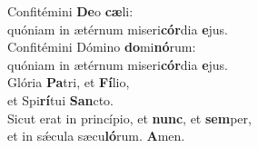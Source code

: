 \evenverse Confitémini \textbf{De}o \textbf{cæ}li:~\*\\
\evenverse quóniam in ætérnum miseri\textbf{cór}dia \textbf{e}jus.\\
\oddverse Confitémini Dómino \textbf{do}mi\textbf{nó}rum:~\*\\
\oddverse quóniam in ætérnum miseri\textbf{cór}dia \textbf{e}jus.\\
\evenverse Glória \textbf{Pa}tri, et \textbf{Fí}lio,~\*\\
\evenverse et Spi\textbf{rí}tui \textbf{San}cto.\\
\oddverse Sicut erat in princípio, et \textbf{nunc}, et \textbf{sem}per,~\*\\
\oddverse et in sǽcula sæcu\textbf{ló}rum. \textbf{A}men.\\
